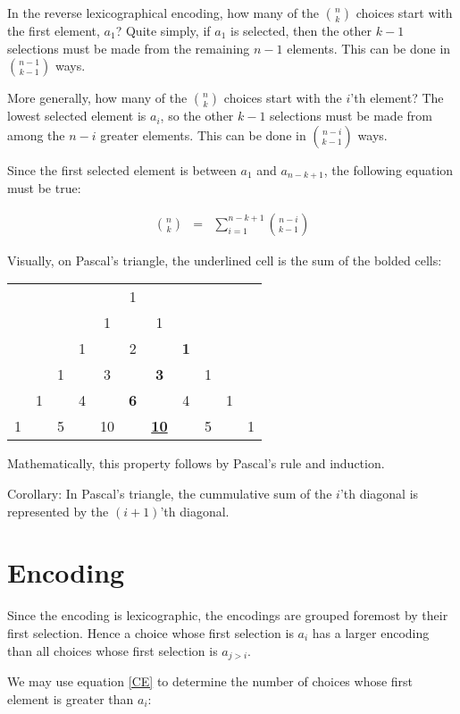 \documentclass[preprint]{sigplanconf}
\begin{document}
	In the reverse lexicographical encoding, how many of the $\binom{n}{k}$ choices start with the first element, $a_1$?
	Quite simply, if $a_1$ is selected, then the other $k-1$ selections must be made from the remaining $n-1$ elements.
	This can be done in $\binom{n-1}{k-1}$ ways.
	
	More generally, how many of the $\binom{n}{k}$ choices start with the $i$'th element?
	The lowest selected element is $a_i$, so the other $k-1$ selections must be made from among the $n-i$ greater elements.
	This can be done in $\binom{n-i}{k-1}$ ways.
	
	Since the first selected element is between $a_1$ and $a_{n-k+1}$, the following equation must be true:
	
	\begin{eqnarray}
		\binom{n}{k} & = & \sum_{i=1}^{n-k+1}{\binom{n-i}{k-1}}
		\label{CE}
	\end{eqnarray}
	
	Visually, on Pascal's triangle, the underlined cell is the sum of the bolded cells:	
	
	\begin{tabular}{ccccccccccc}
	  & & & & & 1 & & & & & \\
	  & & & & 1 & & 1 & & & & \\
	  & & & 1 & & 2 & & \textbf{1} & & & \\
	  & & 1 & & 3 & & \textbf{3} & & 1 & & \\
		& 1 & & 4 & & \textbf{6} & & 4 & & 1 & \\
	  1 & & 5 & & 10 & & \textbf{\underline{10}} & & 5 & & 1
	\end{tabular}
	\vspace{3mm}	
	
	Mathematically, this property follows by Pascal's rule and induction.
	
	Corollary: In Pascal's triangle, the cummulative sum of the $i$'th diagonal is represented by the $(i+1)$'th diagonal.
	
	
	\section{Encoding}
	
	Since the encoding is lexicographic, the encodings are grouped foremost by their first selection.
	Hence a choice whose first selection is $a_i$ has a larger encoding than all choices whose first selection is $a_{j>i}$.
	
	We may use equation \ref{CE} to determine the number of choices whose first element is greater than $a_i$:
	
\end{document}
